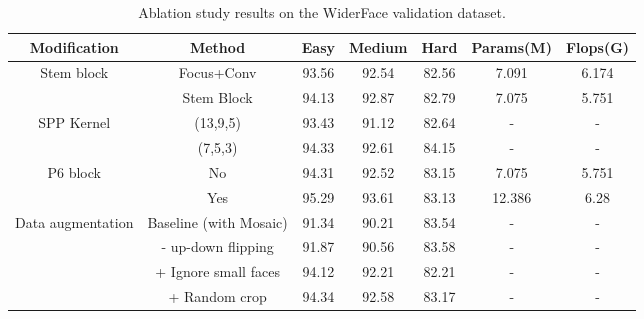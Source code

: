 \documentclass[conference]{IEEEtran}
\begin{document}
\begin{table*}[!htb]
    \centering
    \begin{tabular}{c|c|c|c|c|c|c}
        \hline
        Modification & Method & Easy & Medium &  Hard & Params(M) & Flops(G)  \\
        \hline

        \multirow{2}{*}{Stem block} & Focus+Conv & 93.56 & 92.54 & 82.56 & 7.091 & 6.174 \\ \cline{2-7}
        &  Stem Block & 94.13 & 92.87 & 82.79 & 7.075 &5.751 \\
        \hline
        \multirow{2}{*}{SPP Kernel} & (13,9,5) & 93.43 & 91.12 & 82.64 & - & - \\ \cline{2-7}
        & (7,5,3) & 94.33 & 92.61 & 84.15 & - & - \\
        \hline
        \multirow{2}{*}{P6 block} & No & 94.31  & 92.52 & 83.15 & 7.075 &5.751 \\ \cline{2-7}
         & Yes & 95.29 & 93.61 & 83.13 & 12.386 & 6.28 \\
        \hline
        \multirow{4}{*}{Data augmentation}  & Baseline (with Mosaic) & 91.34  & 90.21 & 83.54 & - & - \\ \cline{2-7}
         & - up-down flipping & 91.87 & 90.56 & 83.58 & - & - \\ \cline{2-7}
         & + Ignore small faces & 94.12 & 92.21 & 82.21 & - & - \\ \cline{2-7}
         & + Random crop & 94.34 & 92.58 & 83.17 & - & - \\ \cline{2-7}
        \hline
    \end{tabular}
    \caption{Ablation study results on the WiderFace validation dataset.}
    \label{t1}
\end{table*}
\end{document}
